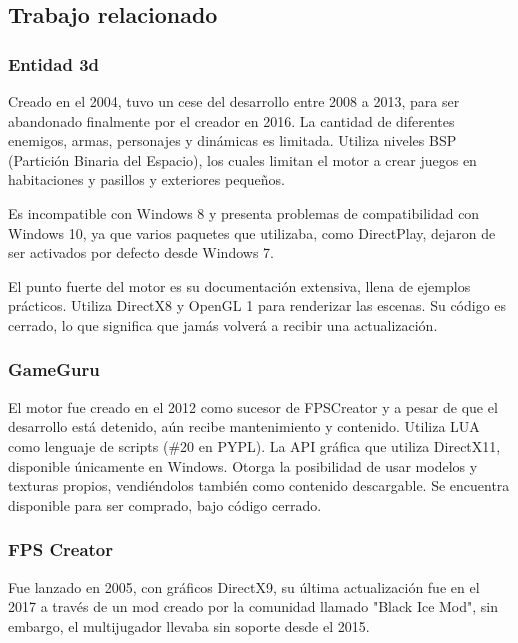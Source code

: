 \documentclass[]{article}
\begin{document}
\subsection{Trabajo relacionado}

\subsubsection{Entidad 3d}

Creado en el 2004, tuvo un cese del desarrollo entre 2008 a 2013, para ser abandonado finalmente por el creador en 2016. La cantidad de diferentes enemigos, armas, personajes y din\'amicas es limitada. Utiliza niveles BSP (Partici\'on Binaria del Espacio), los cuales limitan el motor a crear juegos en habitaciones y pasillos y exteriores peque\~nos. 

Es incompatible con Windows 8 y presenta problemas de compatibilidad con Windows 10, ya que varios paquetes que utilizaba, como DirectPlay, dejaron de ser activados por defecto desde Windows 7. 


El punto fuerte del motor es su documentaci\'on extensiva, llena de ejemplos pr\'acticos.
Utiliza DirectX8 y OpenGL 1 para renderizar las escenas.
Su c\'odigo es cerrado, lo que significa que jam\'as volver\'a a recibir una actualizaci\'on.


\subsubsection{GameGuru}

El motor fue creado en el 2012 como sucesor de FPSCreator y a pesar de que el desarrollo est\'a detenido, a\'un recibe mantenimiento y contenido. 
Utiliza LUA como lenguaje de scripts (\#20 en PYPL).
La API gr\'afica que utiliza DirectX11, disponible únicamente en Windows. Otorga la posibilidad de usar modelos y texturas propios, vendi\'endolos tambi\'en como contenido descargable. Se encuentra disponible para ser comprado, bajo c\'odigo cerrado.

\subsubsection{FPS Creator}

Fue lanzado en 2005, con gr\'aficos DirectX9, su \'ultima actualizaci\'on fue en el 2017 a trav\'es de un mod creado por la comunidad llamado "Black Ice Mod", sin embargo, el multijugador llevaba sin soporte desde el 2015. \cite{MP_discontinued}
\end{document}
